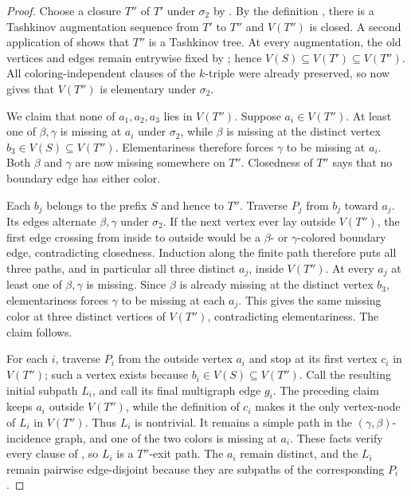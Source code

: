 \begin{proof}
Choose a closure $T''$ of $T'$ under $\sigma_2$ by
.  By the definition
, there is a Tashkinov augmentation sequence from
$T'$ to $T''$ and $V(T'')$ is closed.  A second application of
 shows that
$T''$ is a Tashkinov tree.  At every augmentation, the old vertices and
edges remain entrywise fixed by ; hence
$V(S)\subseteq V(T')\subseteq V(T'')$.  All coloring-independent clauses of the
$k$-triple were already preserved, so  now gives that
$V(T'')$ is elementary under $\sigma_2$.

We claim that none of $a_1,a_2,a_3$ lies in $V(T'')$.  Suppose
$a_i\in V(T'')$.  At least one of $\beta,\gamma$ is missing at $a_i$ under
$\sigma_2$, while $\beta$ is missing at the distinct vertex
$b_3\in V(S)\subseteq V(T'')$.  Elementariness therefore forces
$\gamma$ to be missing at $a_i$.  Both $\beta$ and $\gamma$ are now
missing somewhere on $T''$.  Closedness of $T''$ says that no boundary
edge has either color.

Each $b_j$ belongs to the prefix $S$ and hence to $T''$.  Traverse $P_j$
from $b_j$ toward $a_j$.  Its edges alternate $\beta,\gamma$ under
$\sigma_2$.  If the next vertex ever lay outside $V(T'')$, the first edge
crossing from inside to outside would be a $\beta$- or $\gamma$-colored
boundary edge, contradicting closedness.  Induction along the finite path
therefore puts all three paths, and in particular all three distinct
$a_j$, inside $V(T'')$.  At every $a_j$ at least one of
$\beta,\gamma$ is missing.  Since $\beta$ is already missing at the
distinct vertex $b_3$, elementariness forces $\gamma$ to be missing at
each $a_j$.  This gives the same missing color at three distinct vertices
of $V(T'')$, contradicting elementariness.  The claim follows.

For each $i$, traverse $P_i$ from the outside vertex $a_i$ and stop at its
first vertex $c_i$ in $V(T'')$; such a vertex exists because
$b_i\in V(S)\subseteq V(T'')$.  Call the resulting initial subpath $L_i$,
and call its final multigraph edge $g_i$.  The preceding claim keeps
$a_i$ outside $V(T'')$, while the definition of $c_i$ makes it the only
vertex-node of $L_i$ in $V(T'')$.  Thus $L_i$ is nontrivial.  It remains a
simple path in the $(\gamma,\beta)$-incidence graph, and one of the two
colors is missing at $a_i$.  These facts verify every clause of
, so $L_i$ is a $T''$-exit path.  The $a_i$ remain
distinct, and the $L_i$ remain pairwise edge-disjoint because they are
subpaths of the corresponding $P_i$.


\end{proof}
